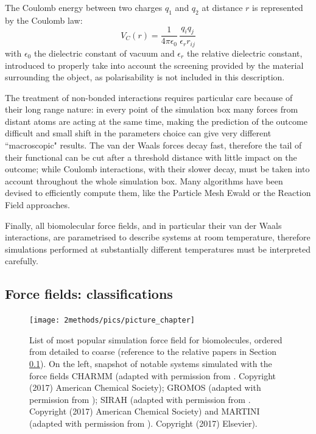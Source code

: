 The Coulomb energy between two charges $q_1$ and $q_2$ at distance $r$ is represented by the Coulomb law:
\begin{equation}
V_C(r) = \frac{1}{4 \pi \epsilon_0} \, \frac{q_i q_j}{\epsilon_r r_{ij}}
\end{equation}
with $\epsilon_0$ the dielectric constant of vacuum and $\epsilon_r$ the relative dielectric constant, introduced to properly take into account the screening provided by the material surrounding the object, as polarisability is not included in this description.

The treatment of non-bonded interactions requires particular care because of their long range nature: in every point of the simulation box many forces from distant atoms are acting at the same time, making the prediction of the outcome difficult and small shift in the parameters choice can give very different ``macroscopic" results.
%
The van der Waals forces decay fast, therefore the tail of their functional can be cut after a threshold distance with little impact on the outcome; while Coulomb interactions, with their slower decay, must be taken into account throughout the whole simulation box. Many algorithms have been devised to efficiently compute them, like the Particle Mesh Ewald \cite{Essmann1995} or the Reaction Field \cite{Tironi1995} approaches.

Finally, all biomolecular force fields, and in particular their van der Waals interactions, are parametrised to describe systems at room temperature, therefore simulations performed at substantially different temperatures must be interpreted carefully.


\subsection{Force fields: classifications} \label{sec:ff_ex}

\begin{figure}[p!]
\centering
\texttt{[image: 2methods/pics/picture\_chapter]}
%
\caption[MD force field classifications]{List of most popular simulation force field for biomolecules, ordered from detailed to coarse (reference to the relative papers in Section \ref{sec:ff_ex}). On the left, snapshot of notable systems simulated with the force fields CHARMM (adapted with permission from \cite{Lipkin2017}. Copyright (2017) American Chemical Society); GROMOS (adapted with permission from \cite{Macpherson2019}); SIRAH (adapted with permission from \cite{Machado2017}. Copyright (2017) American Chemical Society) and MARTINI (adapted with permission from \cite{Samsudin2017}). Copyright (2017) Elsevier).}
\label{fig:ff}
\end{figure}

